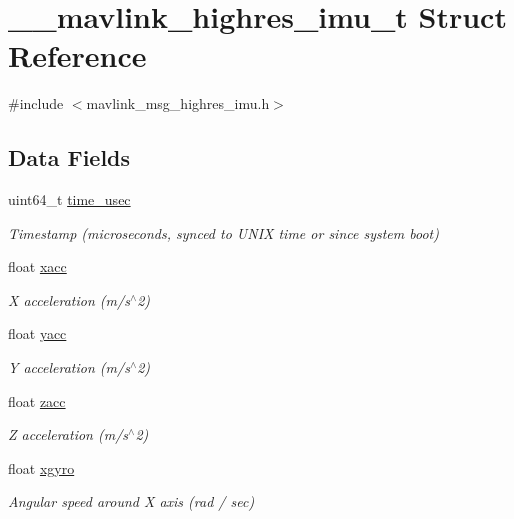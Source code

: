 \hypertarget{struct____mavlink__highres__imu__t}{\section{\+\_\+\+\_\+mavlink\+\_\+highres\+\_\+imu\+\_\+t Struct Reference}
\label{struct____mavlink__highres__imu__t}
}


{\ttfamily \#include $<$mavlink\+\_\+msg\+\_\+highres\+\_\+imu.\+h$>$}

\subsection*{Data Fields}
\begin{DoxyCompactItemize}
\item 
uint64\+\_\+t \hyperlink{struct____mavlink__highres__imu__t_aaf1a08b7dcf5ed9ca8ce6f66c392d678}{time\+\_\+usec}
\begin{DoxyCompactList}\small\item\em Timestamp (microseconds, synced to U\+N\+I\+X time or since system boot) \end{DoxyCompactList}\item 
float \hyperlink{struct____mavlink__highres__imu__t_ace5e765b886ddee9ea50983177bea172}{xacc}
\begin{DoxyCompactList}\small\item\em X acceleration (m/s$^\wedge$2) \end{DoxyCompactList}\item 
float \hyperlink{struct____mavlink__highres__imu__t_aedf7c76d0487a09e980851fd6162ae17}{yacc}
\begin{DoxyCompactList}\small\item\em Y acceleration (m/s$^\wedge$2) \end{DoxyCompactList}\item 
float \hyperlink{struct____mavlink__highres__imu__t_a01f05eb6ed0c4b0db807f22bf6134ab4}{zacc}
\begin{DoxyCompactList}\small\item\em Z acceleration (m/s$^\wedge$2) \end{DoxyCompactList}\item 
float \hyperlink{struct____mavlink__highres__imu__t_ae736b5fdd1185a4ec6c2947d652778e1}{xgyro}
\begin{DoxyCompactList}\small\item\em Angular speed around X axis (rad / sec) \end{DoxyCompactList}\item 

\end{DoxyCompactItemize}
